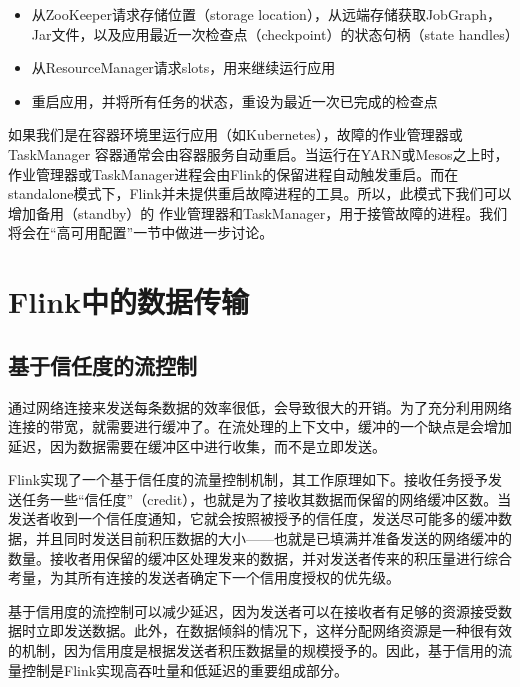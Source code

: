 \documentclass[cn,11pt,chinese]{elegantbook}
\providecommand{\tightlist}{%
  \setlength{\itemsep}{0pt}\setlength{\parskip}{0pt}}
\begin{document}
\begin{itemize}
\tightlist
\item
  从ZooKeeper请求存储位置（storage
  location），从远端存储获取JobGraph，Jar文件，以及应用最近一次检查点（checkpoint）的状态句柄（state
  handles）
\item
  从ResourceManager请求slots，用来继续运行应用
\item
  重启应用，并将所有任务的状态，重设为最近一次已完成的检查点
\end{itemize}

如果我们是在容器环境里运行应用（如Kubernetes），故障的作业管理器或TaskManager
容器通常会由容器服务自动重启。当运行在YARN或Mesos之上时，作业管理器或TaskManager进程会由Flink的保留进程自动触发重启。而在standalone模式下，Flink并未提供重启故障进程的工具。所以，此模式下我们可以增加备用（standby）的
作业管理器和TaskManager，用于接管故障的进程。我们将会在``高可用配置''一节中做进一步讨论。

\hypertarget{flinkux4e2dux7684ux6570ux636eux4f20ux8f93}{%
\section{Flink中的数据传输}\label{flinkux4e2dux7684ux6570ux636eux4f20ux8f93}}

\hypertarget{ux57faux4e8eux4fe1ux4efbux5ea6ux7684ux6d41ux63a7ux5236}{%
\subsection{基于信任度的流控制}\label{ux57faux4e8eux4fe1ux4efbux5ea6ux7684ux6d41ux63a7ux5236}}

通过网络连接来发送每条数据的效率很低，会导致很大的开销。为了充分利用网络连接的带宽，就需要进行缓冲了。在流处理的上下文中，缓冲的一个缺点是会增加延迟，因为数据需要在缓冲区中进行收集，而不是立即发送。

Flink实现了一个基于信任度的流量控制机制，其工作原理如下。接收任务授予发送任务一些``信任度''（credit），也就是为了接收其数据而保留的网络缓冲区数。当发送者收到一个信任度通知，它就会按照被授予的信任度，发送尽可能多的缓冲数据，并且同时发送目前积压数据的大小------也就是已填满并准备发送的网络缓冲的数量。接收者用保留的缓冲区处理发来的数据，并对发送者传来的积压量进行综合考量，为其所有连接的发送者确定下一个信用度授权的优先级。

基于信用度的流控制可以减少延迟，因为发送者可以在接收者有足够的资源接受数据时立即发送数据。此外，在数据倾斜的情况下，这样分配网络资源是一种很有效的机制，因为信用度是根据发送者积压数据量的规模授予的。因此，基于信用的流量控制是Flink实现高吞吐量和低延迟的重要组成部分。
\end{document}
